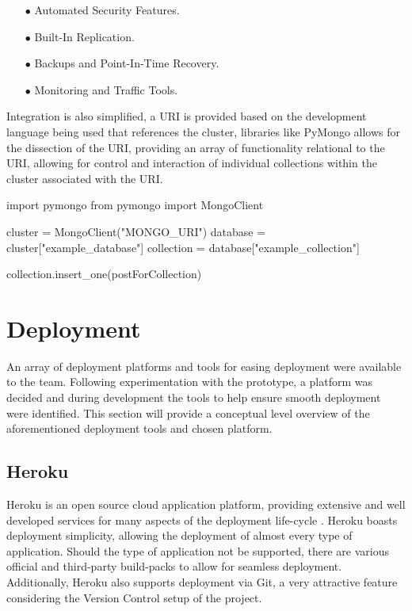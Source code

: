 \begin{enumerate}
    \item[$\bullet$] Automated Security Features.
    \item[$\bullet$] Built-In Replication.
    \item[$\bullet$] Backups and Point-In-Time Recovery.
    \item[$\bullet$] Monitoring and Traffic Tools.
\end{enumerate}

Integration is also simplified, a URI is provided based on the development language being used that references the cluster, libraries like PyMongo allows for the dissection of the URI, providing an array of functionality relational to the URI, allowing for control and interaction of individual collections within the cluster associated with the URI.\newline

\begin{python}[caption=Defining and Accessing a Mongo Collection with Python]
import pymongo
from pymongo import MongoClient

cluster = MongoClient("MONGO_URI")
database = cluster["example_database"]
collection = database["example_collection"]

collection.insert_one(postForCollection)
\end{python}

\section{Deployment}
An array of deployment platforms and tools for easing deployment were available to the team. Following experimentation with the prototype, a platform was decided and during development the tools to help ensure smooth deployment were identified. This section will provide a conceptual level overview of the aforementioned deployment tools and chosen platform.

\subsection{Heroku}
Heroku is an open source cloud application platform, providing extensive and well developed services for many aspects of the deployment life-cycle \cite{HEROKU}. Heroku boasts deployment simplicity, allowing the deployment of almost every type of application. Should the type of application not be supported, there are various official and third-party build-packs to allow for seamless deployment. Additionally, Heroku also supports deployment via Git, a very attractive feature considering the Version Control setup of the project.

